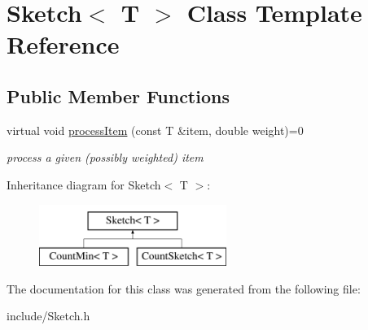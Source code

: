 \hypertarget{classSketch}{}\section{Sketch$<$ T $>$ Class Template Reference}
\label{classSketch}
\subsection*{Public Member Functions}
\begin{DoxyCompactItemize}
\item 
virtual void \hyperlink{classSketch_a20fb9ecaa71ae5620ec76abcc508bfdc}{process\+Item} (const T \&item, double weight)=0\hypertarget{classSketch_a20fb9ecaa71ae5620ec76abcc508bfdc}{}\label{classSketch_a20fb9ecaa71ae5620ec76abcc508bfdc}

\begin{DoxyCompactList}\small\item\em process a given (possibly weighted) item \end{DoxyCompactList}\end{DoxyCompactItemize}
Inheritance diagram for Sketch$<$ T $>$\+:\begin{figure}[H]
\begin{center}
\leavevmode
\includegraphics[height=2.000000cm]{classSketch}
\end{center}
\end{figure}


The documentation for this class was generated from the following file\+:\begin{DoxyCompactItemize}
\item 
include/Sketch.\+h\end{DoxyCompactItemize}
